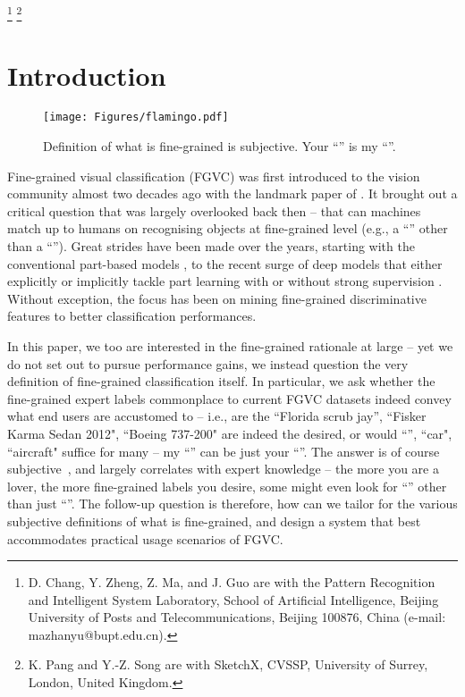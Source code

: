 \documentclass[final]{cvpr}
\begin{document}
\footnote{D. Chang, Y. Zheng, Z. Ma, and J. Guo are with the Pattern Recognition and Intelligent
System Laboratory, School of Artificial Intelligence, Beijing University of Posts and Telecommunications, Beijing 100876, China (e-mail: mazhanyu@bupt.edu.cn).}
\footnote{K. Pang and Y.-Z. Song  are with SketchX, CVSSP, University of Surrey, London, United Kingdom.}


\vspace{-10mm}
\section{Introduction}

\begin{figure}[t]
\begin{center}
\texttt{[image: Figures/flamingo.pdf]}
\end{center}

  \caption{Definition of what is fine-grained is subjective. Your ``'' is my ``''.}
\label{fig:Labrador}
\vspace{-5mm}
\end{figure}
Fine-grained visual classification (FGVC) was first introduced to the vision community almost two decades ago with the landmark paper of \cite{biederman1999subordinate}. It brought out a critical question that was largely overlooked back then -- that can machines match up to humans on recognising objects at fine-grained level (e.g., a ``'' other than a ``''). Great strides have been made over the years, starting with the conventional part-based models \cite{yao2012codebook,gao2013learning,berg2013poof,branson2014bird}, to the recent surge of deep models that either explicitly or implicitly tackle part learning with or without strong supervision \cite{lin2015bilinear,Peng2018Object,zhang2016picking,zheng2017learning,Zheng_2019_CVPR,wu2019leveraging}. Without exception, the focus has been on mining fine-grained discriminative features to better classification performances.

In this paper, we too are interested in the fine-grained rationale at large -- yet we do not set out to pursue performance gains,  we instead question the very definition of fine-grained classification itself. In particular, we ask whether the fine-grained expert labels commonplace to current FGVC datasets indeed convey what end users are accustomed to -- i.e., are the ``Florida scrub jay'', ``Fisker Karma Sedan 2012", ``Boeing 737-200" are indeed the desired, or would  ``'', ``car", ``aircraft" suffice for many -- my ``'' can be just your ``''. The answer is of course subjective~\cite{ordonez2015predicting}, and largely correlates with expert knowledge -- the more you are a  lover, the more fine-grained labels you desire, some might even look for ``'' other than just ``''. The follow-up question is therefore, how can we tailor for the various subjective definitions of what is fine-grained, and design a system that best accommodates practical usage scenarios of FGVC. 
\end{document}
